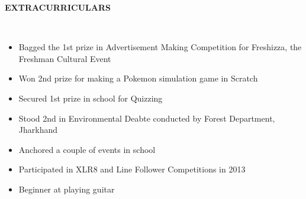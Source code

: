 \documentclass[a4paper,10pt]{article}
\newcommand{\lsep}{-0.5cm}
\newcommand{\resheading}[1]{{\small \colorbox{mygrey}{\begin{minipage}{0.975\textwidth}{\textbf{#1 \vphantom{p\^{E}}}}\end{minipage}}}}
\begin{document}
\resheading{\textbf{EXTRACURRICULARS} }\\[\lsep]
\begin{itemize}
 \itemsep 0em
 \item Bagged the 1st prize in Advertisement Making Competition for Freshizza, the Freshman Cultural Event
 \item Won 2nd prize for making a Pokemon simulation game in Scratch
 \item Secured 1st prize in school for Quizzing
 \item Stood 2nd in Environmental Deabte conducted by Forest Department, Jharkhand
 \item Anchored a couple of events in school
 \item Participated in XLR8 and Line Follower Competitions in 2013
 \item Beginner at playing guitar
\end{itemize}
\end{document}
